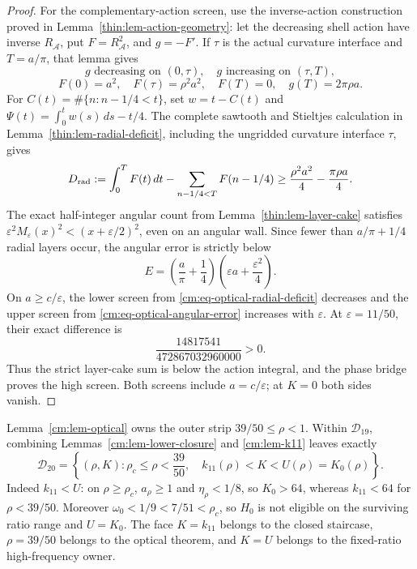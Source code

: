 \documentclass[11pt]{article}
\numberwithin{equation}{section}
\theoremstyle{definition}
\theoremstyle{remark}
\begin{document}
\begin{proof}
For the complementary-action screen, use the inverse-action construction
proved in Lemma~\ref{thin:lem-action-geometry}: let the decreasing shell
action have inverse \(R_{\mathcal A}\), put \(F=R_{\mathcal A}^2\), and
\(g=-F'\).  If \(\tau\) is the actual curvature interface and
\(T=a/\pi\), that lemma gives
\[
 g\text{ decreasing on }(0,\tau),\quad
 g\text{ increasing on }(\tau,T),
\]
\[
 F(0)=a^2,\quad F(\tau)=\rho^2a^2,\quad F(T)=0,\quad
 g(T)=2\pi\rho a.
\]
For \(C(t)=\#\{n:n-1/4<t\}\), set \(w=t-C(t)\) and
\(\Psi(t)=\int_0^tw(s)\,ds-t/4\).  The complete sawtooth and Stieltjes
calculation in Lemma~\ref{thin:lem-radial-deficit}, including the ungridded
curvature interface \(\tau\), gives
\begin{equation}
 D_{\rm rad}:=\int_0^TF(t)\,dt
 -\sum_{n-1/4<T}F(n-1/4)
 \geq\frac{\rho^2a^2}{4}-\frac{\pi\rho a}{4}.
 \label{cm:eq-optical-radial-deficit}
\end{equation}
The exact half-integer angular count from
Lemma~\ref{thin:lem-layer-cake} satisfies
\(\varepsilon^2M_\varepsilon(x)^2<(x+\varepsilon/2)^2\), even on an
angular wall.  Since fewer than \(a/\pi+1/4\) radial layers occur, the
angular error is strictly below
\begin{equation}
 E=\left(\frac a\pi+\frac14\right)
 \left(\varepsilon a+\frac{\varepsilon^2}{4}\right).
 \label{cm:eq-optical-angular-error}
\end{equation}
On \(a\geq c/\varepsilon\), the lower screen from
\eqref{cm:eq-optical-radial-deficit} decreases and the upper screen from
\eqref{cm:eq-optical-angular-error} increases with \(\varepsilon\).  At
\(\varepsilon=11/50\), their exact difference is
\begin{equation}
 \frac{14817541}{472867032960000}>0.
 \label{cm:eq-optical-high-reserve}
\end{equation}
Thus the strict layer-cake sum is below the action integral, and the phase
bridge proves the high screen.  Both screens include
\(a=c/\varepsilon\); at \(K=0\) both sides vanish.
\end{proof}

Lemma~\ref{cm:lem-optical} owns the outer strip
\(39/50\leq\rho<1\).  Within \(\mathcal D_{19}\), combining
Lemmas~\ref{cm:lem-lower-closure} and \ref{cm:lem-k11} leaves exactly
\begin{equation}
 \boxed{
 \mathcal D_{20}=
 \left\{(\rho,K):\rho_c\leq\rho<\frac{39}{50},\quad
 k_{11}(\rho)<K<U(\rho)=K_0(\rho)\right\}.}
 \label{cm:eq-D20}
\end{equation}
Indeed \(k_{11}<U\): on \(\rho\geq\rho_c\),
\(a_\rho\geq1\) and \(\eta_\rho<1/8\), so \(K_0>64\), whereas
\(k_{11}<64\) for \(\rho<39/50\).  Moreover
\(\omega_0<1/9<7/51<\rho_c\), so \(H_0\) is not eligible on the
surviving ratio range and \(U=K_0\).  The face \(K=k_{11}\) belongs to the closed
staircase, \(\rho=39/50\) belongs to the optical theorem, and \(K=U\)
belongs to the fixed-ratio high-frequency owner.
\end{document}
